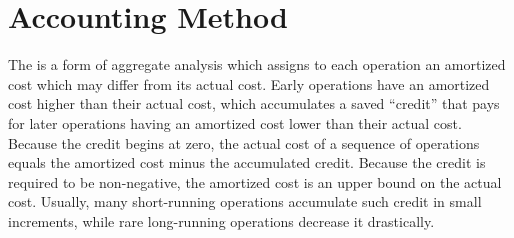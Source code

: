 
\section{Accounting Method}

The  is a form of aggregate analysis which assigns to each operation an amortized cost which may differ from its actual cost. Early operations have an amortized cost higher than their actual cost, which accumulates a saved ``credit'' that pays for later operations having an amortized cost lower than their actual cost. Because the credit begins at zero, the actual cost of a sequence of operations equals the amortized cost minus the accumulated credit. Because the credit is required to be non-negative, the amortized cost is an upper bound on the actual cost. Usually, many short-running operations accumulate such credit in small increments, while rare long-running operations decrease it drastically.


